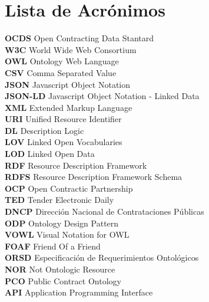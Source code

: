 \newpage
\chapter*{Lista de Acrónimos\hfill}
\begin{tabbing}



\textbf{OCDS} Open Contracting Data Stantard\\
\textbf{W3C} World Wide Web Consortium\\
\textbf{OWL} Ontology Web Language\\
\textbf{CSV} Comma Separated Value\\
\textbf{JSON} Javascript Object Notation\\
\textbf{JSON-LD} Javascript Object Notation - Linked Data\\
\textbf{XML} Extended Markup Language\\
\textbf{URI} Unified Resource Identifier\\
\textbf{DL} Description Logic\\
\textbf{LOV} Linked Open Vocabularies\\
\textbf{LOD} Linked Open Data\\
\textbf{RDF} Resource Description Framework\\
\textbf{RDFS} Resource Description Framework Schema\\
\textbf{OCP} Open Contractic Partnership\\
\textbf{TED} Tender Electronic Daily\\
\textbf{DNCP} Dirección Nacional de Contrataciones Públicas\\
\textbf{ODP} Ontology Design Pattern\\
\textbf{VOWL} Visual Notation for OWL\\
\textbf{FOAF} Friend Of a Friend\\
\textbf{ORSD} Especificación de Requerimientos Ontológicos\\
\textbf{NOR} Not Ontologic Resource\\
\textbf{PCO} Public Contract Ontology\\
\textbf{API} Application Programming Interface\\



\end{tabbing}